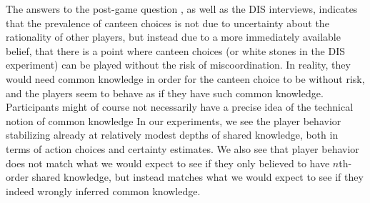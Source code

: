 The answers to the post-game question , as well as the DIS interviews, indicates that the prevalence of canteen choices is not due to uncertainty about the rationality of other players, but instead due to a more immediately available belief, that there is a point where canteen choices (or white stones in the DIS experiment) can be played without the risk of miscoordination. In reality, they would need common knowledge in order for the canteen choice to be without risk, and the players seem to behave as if they have such common knowledge. Participants might of course not necessarily have a precise idea of the technical notion of common knowledge In our experiments, we see the player behavior stabilizing already at relatively modest depths of shared knowledge, both in terms of action choices and certainty estimates. We also see that player behavior does not match what we would expect to see if they only believed to have $n$th-order shared knowledge, but instead matches what we would expect to see if they indeed wrongly inferred common knowledge.


